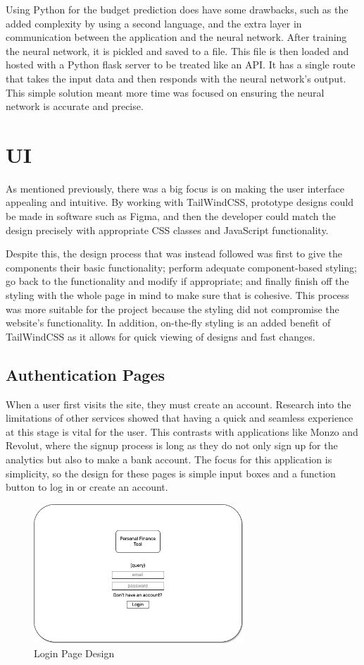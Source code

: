 Using Python for the budget prediction does have some drawbacks, such as the added complexity by using a second language, and the extra layer in communication between the application and the neural network. After training the neural network, it is pickled and saved to a file. This file is then loaded and hosted with a Python flask server to be treated like an API. It has a single route that takes the input data and then responds with the neural network's output. This simple solution meant more time was focused on ensuring the neural network is accurate and precise.

\section{UI}
\label{sec:ui}
As mentioned previously, there was a big focus is on making the user interface appealing and intuitive. By working with TailWindCSS, prototype designs could be made in software such as Figma, and then the developer could match the design precisely with appropriate CSS classes and JavaScript functionality.

Despite this, the design process that was instead followed was first to give the components their basic functionality; perform adequate component-based styling; go back to the functionality and modify if appropriate; and finally finish off the styling with the whole page in mind to make sure that is cohesive. This process was more suitable for the project because the styling did not compromise the website's functionality. In addition, on-the-fly styling is an added benefit of TailWindCSS as it allows for quick viewing of designs and fast changes.

\subsection{Authentication Pages}
When a user first visits the site, they must create an account. Research into the limitations of other services showed that having a quick and seamless experience at this stage is vital for the user. This contrasts with applications like Monzo and Revolut, where the signup process is long as they do not only sign up for the analytics but also to make a bank account. The focus for this application is simplicity, so the design for these pages is simple input boxes and a function button to log in or create an account.

\begin{figure}[H]
	\centering
	\includegraphics[width=0.7\textwidth]{images/login_specification.png}
	\caption{Login Page Design}
	\label{fig:LoginPage}
\end{figure}

